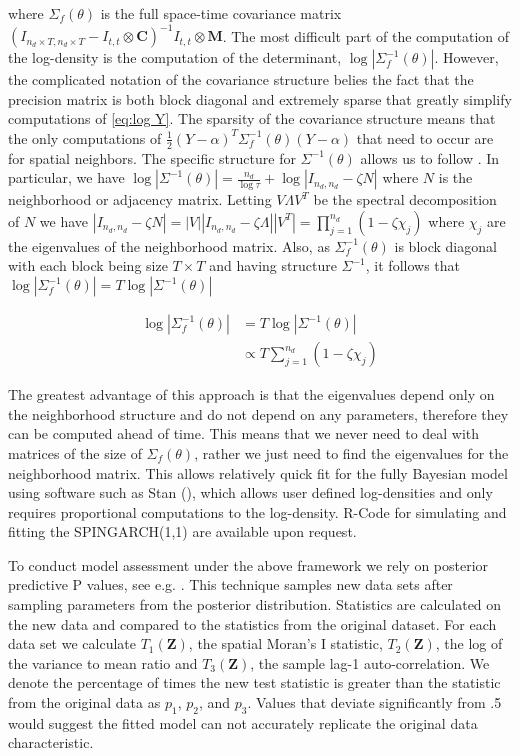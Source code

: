 \documentclass[11pt]{isuthesis}
\begin{document}
where $\Sigma_f(\theta)$ is the full space-time covariance matrix $\left(I_{n_d \times T,n_d \times T}-I_{t,t}\otimes \boldsymbol{C}\right)^{-1}I_{t,t}\otimes \boldsymbol{M}$.  The most difficult part of the computation of the log-density is the computation of the determinant, $\log | \Sigma_f^{-1}(\theta)|$.  However, the complicated notation of the covariance structure belies the fact that the precision matrix is both block diagonal and extremely sparse that greatly simplify computations of \eqref{eq:log Y}.  The sparsity of the covariance structure means that the only computations of $\frac{1}{2}(Y-\alpha)^T\Sigma_f^{-1}(\theta)(Y-\alpha)$ that need to occur are for spatial neighbors.  The specific structure for $\Sigma^{-1}(\theta)$ allows us to follow \cite{jin2005generalized}.  In particular, we have $\log|\Sigma^{-1}(\theta)|=\frac{n_d}{\log\tau}+\log|I_{n_d,n_d}-\zeta N|$ where $N$ is the neighborhood or adjacency matrix.  Letting $V \Lambda V^T$ be the spectral decomposition of $N$ we have $|I_{n_d,n_d}-\zeta N|=|V| |I_{n_d,n_d}-\zeta \Lambda| |V^T|=\prod_{j=1}^{n_d}\left(1-\zeta \chi_j\right)$ where $\chi_j$ are the eigenvalues of the neighborhood matrix.  Also, as $ \Sigma_f^{-1}(\theta)$ is block diagonal with each block being size $T \times T$ and having structure $\Sigma^{-1}$, it follows that $\log| \Sigma_f^{-1}(\theta)|=T\log| \Sigma^{-1}(\theta)|$

\begin{align}
	\log | \Sigma_f^{-1}(\theta)|&  = T \log | \Sigma^{-1}(\theta)|\\
	& \propto T \sum_{j=1}^{n_d}(1-\zeta\chi_j) \label{eq:eig}
\end{align}

The greatest advantage of this approach is that the eigenvalues depend only on the neighborhood structure and do not depend on any parameters, therefore they can be computed ahead of time.  This means that we never need to deal with matrices of the size of  $\Sigma_f(\theta)$, rather we just need to find the eigenvalues for the neighborhood matrix.  This allows relatively quick fit for the fully Bayesian model using software such as Stan (\cite{carpenter2016stan}), which allows user defined log-densities and only requires proportional computations to the log-density.  R-Code for simulating and fitting the SPINGARCH(1,1) are available upon request.

To conduct model assessment under the above framework we rely on posterior predictive P values, see e.g. \cite{gelman1996posterior}.  This technique samples new data sets after sampling parameters from the posterior distribution.  Statistics are calculated on the new data and compared to the statistics from the original dataset.  For each data set we calculate $T_1(\boldsymbol{Z})$, the spatial Moran's I statistic, $T_2(\boldsymbol{Z})$, the log of the variance to mean ratio and $T_3(\boldsymbol{Z})$, the sample lag-1 auto-correlation.  We denote the percentage of times the new test statistic is greater than the statistic from the original data as $p_1$, $p_2$, and $p_3$.  Values that deviate significantly from .5 would suggest the fitted model can not accurately replicate the original data characteristic.
\end{document}

